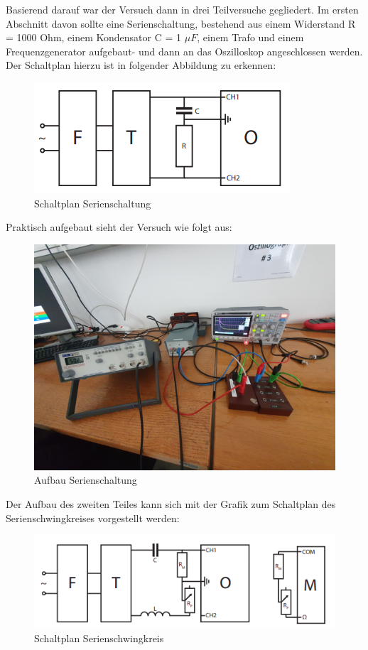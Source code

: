 \documentclass[12pt,a4paper,twoside]{article}
\begin{document}
\noindent
Basierend darauf war der Versuch dann in drei Teilversuche gegliedert. Im ersten Abschnitt davon sollte eine Serienschaltung, bestehend aus einem Widerstand R = 1000 Ohm, einem Kondensator C = 1 $\mu F$, einem Trafo und einem Frequenzgenerator aufgebaut- und dann an das Oszilloskop angeschlossen werden.
Der Schaltplan hierzu ist in folgender Abbildung zu erkennen:

\begin{figure}[H]
    \centering
    \includegraphics[width=0.6\linewidth, angle=0]{nudes/3.2 Schaltplan.png}
    \caption{Schaltplan Serienschaltung}
    \label{fig:Schaltplan Serienschaltung}
\end{figure}

\noindent
Praktisch aufgebaut sieht der Versuch wie folgt aus:

\begin{figure}[H]
    \centering
    \includegraphics[width=0.6\linewidth, angle=0]{nudes/Aufbau Serienschaltung.jpg}
    \caption{Aufbau Serienschaltung}
    \label{fig:Aufbau Serienschaltung}
\end{figure} 

\noindent
Der Aufbau des zweiten Teiles kann sich mit der Grafik zum Schaltplan des Serienschwingkreises vorgestellt werden:

\begin{figure}[H]
    \centering
    \includegraphics[width=0.6\linewidth, angle=0]{nudes/3.3 Serienschwingkreis.png}
    \caption{Schaltplan Serienschwingkreis}
    \label{fig:Schaltplan Serienschwingkreis}
\end{figure}
\end{document}

